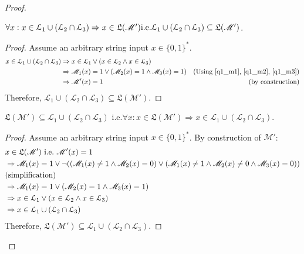 \documentclass[usletter]{article}
\newcommand {\langset}[1]      {\ensuremath{\mathcal{#1}}}
\newcommand {\machine}[1]      {\ensuremath{\mathscr{#1}}}
\newcommand {\langfunc}        {\ensuremath{\mathfrak{L}}}
\newcommand{\ie}{\textnormal{i.e.}}
\newcommand {\langL}          {\langset{L}}
\newcommand {\machineM}       {\machine{M}}
\newcommand {\allstrings}     {\ensuremath{\{0,1\}^*}}
\begin{document}
\begin{enumerate}
\begin{proof}
    \begin{claim}
      $\forall x : x \in \langL_1 \cup (\langL_2 \cap \langL_3)
                  \Rightarrow x \in \langfunc(\machineM') \ie
        \langL_1 \cup (\langL_2 \cap \langL_3) \subseteq \langfunc(\machineM')$.
    \end{claim}
    \begin{proof}
      Assume an arbitrary string input $x \in \allstrings$.
      \begin{align*}
        x \in \langL_1 \cup (\langL_2 \cap \langL_3)
          &\Rightarrow x \in \langL_1
              \vee (x \in \langL_2 \wedge x \in \langL_3) \\
          &\Rightarrow \machineM_1(x) = 1
            \vee (\machineM_2(x) = 1 \wedge \machineM_3(x) = 1)
            & \textnormal{(Using \ref{q1_m1}, \ref{q1_m2}, \ref{q1_m3})} \\
          &\Rightarrow \machineM'(x) = 1 & \textnormal{(by construction)}
      \end{align*}
      Therefore,
      $\langL_1 \cup (\langL_2 \cap \langL_3) \subseteq \langfunc(\machineM')$.
    \end{proof}

    \begin{claim}
      $\langfunc(\machineM') \subseteq \langL_1 \cup (\langL_2 \cap \langL_3)$
      \ie $\forall x : x \in \langfunc(\machineM')
                      \Rightarrow x \in \langL_1 \cup (\langL_2 \cap \langL_3)$.
    \end{claim}
    \begin{proof}
      Assume an arbitrary string input $x \in \allstrings$.
      By construction of $\machineM'$:
      \begin{align*}
        &x \in \langfunc(\machineM') \ \ie \ \machineM'(x) = 1 \\
        &\Rightarrow \machineM_1(x) = 1
          \vee \neg ((\machineM_1(x) \neq 1 \wedge \machineM_2(x) = 0)
                     \vee (\machineM_1(x) \neq 1 \wedge \machineM_2(x) \neq 0
                                                 \wedge \machineM_3(x) = 0)) \\
        &\textnormal{(simplification)} \\
        &\Rightarrow \machineM_1(x) = 1
          \vee (\machineM_2(x) = 1 \wedge \machineM_3(x) = 1) \\
        &\Rightarrow x \in \langL_1
          \vee (x \in \langL_2 \wedge x \in \langL_3) \\
        &\Rightarrow x \in \langL_1 \cup (\langL_2 \cap \langL_3)
      \end{align*}
      Therefore,
      $\langfunc(\machineM') \subseteq \langL_1 \cup (\langL_2 \cap \langL_3)$.
    \end{proof}


\end{proof}
\end{enumerate}
\end{document}
